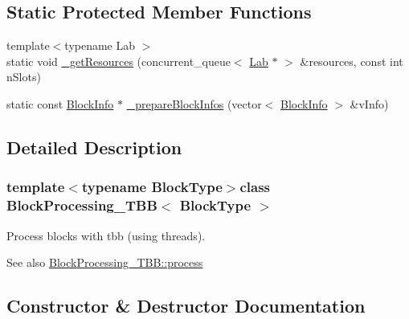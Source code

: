 \subsection*{Static Protected Member Functions}
\begin{DoxyCompactItemize}
\item 
{\footnotesize template$<$typename Lab $>$ }\\static void \hyperlink{class_block_processing___t_b_b_a4a77964ec9a1bbf0054f4e5e511ae8ea}{\+\_\+get\+Resources} (concurrent\+\_\+queue$<$ \hyperlink{_definitions_8h_ad6f951af9a2a6ebc1975404882b34314}{Lab} $\ast$ $>$ \&resources, const int n\+Slots)
\item 
static const \hyperlink{struct_block_info}{Block\+Info} $\ast$ \hyperlink{class_block_processing___t_b_b_a5316cc197b479887abb3c9b74cdf9c31}{\+\_\+prepare\+Block\+Infos} (vector$<$ \hyperlink{struct_block_info}{Block\+Info} $>$ \&v\+Info)
\end{DoxyCompactItemize}


\subsection{Detailed Description}
\subsubsection*{template$<$typename Block\+Type$>$class Block\+Processing\+\_\+\+T\+B\+B$<$ Block\+Type $>$}

Process blocks with tbb (using threads). \begin{DoxySeeAlso}{See also}
\hyperlink{class_block_processing___t_b_b_afb4ac5aee8af3d4e9f3a0f572bdd0a04}{Block\+Processing\+\_\+\+T\+B\+B\+::process} 
\end{DoxySeeAlso}


\subsection{Constructor \& Destructor Documentation}
\hypertarget{class_block_processing___t_b_b_a1a3d202984fe1c763a1d3a60ed1c8da8}{}
